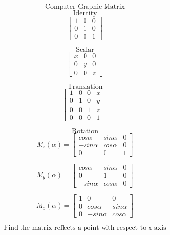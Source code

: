 \documentclass[10pt]{article}
\begin{document}
\[\text{Computer Graphic Matrix} \]
\[\text{Identity}\]
\[
        \begin{bmatrix}
            1 & 0 & 0\\
            0 & 1 & 0\\   
            0 & 0 & 1  
        \end{bmatrix}
\]

\[ \text{Scalar} \]
\[
        \begin{bmatrix}
            x & 0 & 0\\
            0 & y & 0\\   
            0 & 0 & z  
        \end{bmatrix}
\]

\[ \text{Translation} \]
\[
        \begin{bmatrix}
            1 & 0 & 0 & x\\
            0 & 1 & 0 & y\\   
            0 & 0 & 1 & z\\  
            0 & 0 & 0 & 1  
        \end{bmatrix}
\]

\[ \text{Rotation} \]
\[
    M_{z}(\alpha)=\begin{bmatrix}
            cos\alpha & sin\alpha & 0\\
            -sin\alpha & cos\alpha & 0\\   
            0      &   0    & 1  
        \end{bmatrix}
\]

\[
    M_{y}(\alpha)=\begin{bmatrix}
            cos\alpha & sin\alpha & 0\\
            0      &   1    & 0    \\  
            -sin\alpha & cos\alpha & 0   
        \end{bmatrix}
\]

\[
    M_{x}(\alpha)=\begin{bmatrix}
            1 &   0      &     0   \\         
            0 & cos\alpha & sin\alpha\\
            0 & -sin\alpha& cos\alpha   
        \end{bmatrix}
\]

\newpage
\[ \text{Find the matrix reflects a point with respect to x-axis} \]
\end{document}
